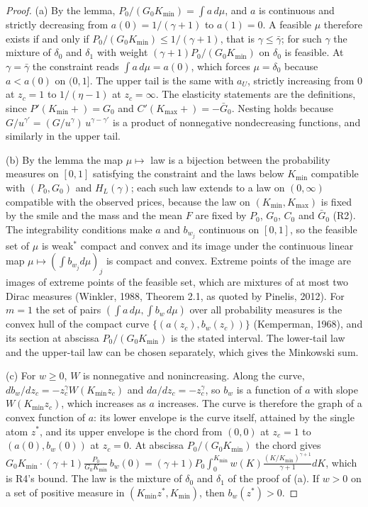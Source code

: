 \documentclass[11pt]{article}
\theoremstyle{remark}
\begin{document}
\begin{proof}
(a) By the lemma, $P_0/(G_0K_{\min})=\int a\,d\mu$, and $a$ is continuous and strictly decreasing from $a(0)=1/(\gamma+1)$ to $a(1)=0$. A feasible $\mu$ therefore exists if and only if $P_0/(G_0K_{\min})\le1/(\gamma+1)$, that is $\gamma\le\bar\gamma$; for such $\gamma$ the mixture of $\delta_0$ and $\delta_1$ with weight $(\gamma+1)P_0/(G_0K_{\min})$ on $\delta_0$ is feasible. At $\gamma=\bar\gamma$ the constraint reads $\int a\,d\mu=a(0)$, which forces $\mu=\delta_0$ because $a<a(0)$ on $(0,1]$. The upper tail is the same with $a_U$, strictly increasing from $0$ at $z_c=1$ to $1/(\eta-1)$ at $z_c=\infty$. The elasticity statements are the definitions, since $P'(K_{\min}+)=G_0$ and $C'(K_{\max}+)=-\bar G_0$. Nesting holds because $G/u^{\gamma'}=(G/u^\gamma)\,u^{\gamma-\gamma'}$ is a product of nonnegative nondecreasing functions, and similarly in the upper tail.

(b) By the lemma the map $\mu\mapsto$ law is a bijection between the probability measures on $[0,1]$ satisfying the constraint and the laws below $K_{\min}$ compatible with $(P_0,G_0)$ and $H_L(\gamma)$; each such law extends to a law on $(0,\infty)$ compatible with the observed prices, because the law on $(K_{\min},K_{\max})$ is fixed by the smile and the mass and the mean $F$ are fixed by $P_0$, $G_0$, $C_0$ and $\bar G_0$ (R2). The integrability conditions make $a$ and $b_{w_j}$ continuous on $[0,1]$, so the feasible set of $\mu$ is weak$^*$ compact and convex and its image under the continuous linear map $\mu\mapsto(\int b_{w_j}d\mu)_j$ is compact and convex. Extreme points of the image are images of extreme points of the feasible set, which are mixtures of at most two Dirac measures (Winkler, 1988, Theorem 2.1, as quoted by Pinelis, 2012). For $m=1$ the set of pairs $(\int a\,d\mu,\int b_w\,d\mu)$ over all probability measures is the convex hull of the compact curve $\{(a(z_c),b_w(z_c))\}$ (Kemperman, 1968), and its section at abscissa $P_0/(G_0K_{\min})$ is the stated interval. The lower-tail law and the upper-tail law can be chosen separately, which gives the Minkowski sum.

(c) For $w\ge0$, $W$ is nonnegative and nonincreasing. Along the curve, $db_w/dz_c=-z_c^\gamma W(K_{\min}z_c)$ and $da/dz_c=-z_c^\gamma$, so $b_w$ is a function of $a$ with slope $W(K_{\min}z_c)$, which increases as $a$ increases. The curve is therefore the graph of a convex function of $a$: its lower envelope is the curve itself, attained by the single atom $z^*$, and its upper envelope is the chord from $(0,0)$ at $z_c=1$ to $(a(0),b_w(0))$ at $z_c=0$. At abscissa $P_0/(G_0K_{\min})$ the chord gives $G_0K_{\min}\cdot(\gamma+1)\frac{P_0}{G_0K_{\min}}\,b_w(0)=(\gamma+1)P_0\int_0^{K_{\min}}w(K)\frac{(K/K_{\min})^{\gamma+1}}{\gamma+1}dK$, which is R4's bound. The law is the mixture of $\delta_0$ and $\delta_1$ of the proof of (a). If $w>0$ on a set of positive measure in $(K_{\min}z^*,K_{\min})$, then $b_w(z^*)>0$.


\end{proof}
\end{document}
